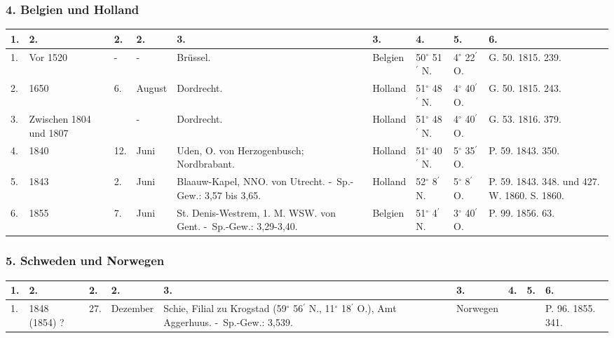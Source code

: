 \documentclass[a4paper, 8pt, oneside, polutonikogreek, german]{article}
\begin{document}
\subsubsection{4. Belgien und Holland}
\begin{table}[!ht]
    \centering
    \begin{tabular}{|l|p{17mm}|l|l|p{48mm}|l|l|l|p{13mm}|}
    \hline
        1. & 2. & 2. & 2. & 3. & 3. & 4. & 5. & 6. \\ \hline
        1. & Vor 1520 & - & - & Brüssel. & Belgien & 50$^\circ$ 51$^\prime$ N. & 4$^\circ$ 22$^\prime$ O. & G. 50. 1815. 239. \\ \hline
        2. & 1650 & 6. & August & Dordrecht. & Holland & 51$^\circ$ 48$^\prime$ N. & 4$^\circ$ 40$^\prime$ O. & G. 50. 1815. 243. \\ \hline
        3. & Zwischen 1804 und 1807 & ~ & - & Dordrecht. & Holland & 51$^\circ$ 48$^\prime$ N. & 4$^\circ$ 40$^\prime$ O. & G. 53. 1816. 379. \\ \hline
        4. & 1840 & 12. & Juni & Uden, O. von Herzogenbusch; Nordbrabant. & Holland & 51$^\circ$ 40$^\prime$ N. & 5$^\circ$ 35$^\prime$ O. & P. 59. 1843. 350. \\ \hline
        5. & 1843 & 2. & Juni & Blaauw-Kapel, NNO. von Utrecht. - Sp.-Gew.: 3,57 bis 3,65. & Holland & 52$^\circ$ 8$^\prime$ N. & 5$^\circ$ 8$^\prime$ O. & P. 59. 1843. 348. und 427. W. 1860. S. 1860. \\ \hline
        6. & 1855 & 7. & Juni & St. Denis-Westrem, 1. M. WSW. von Gent. - Sp.-Gew.: 3,29-3,40. & Belgien & 51$^\circ$ 4$^\prime$ N. & 3$^\circ$ 40$^\prime$ O. & P. 99. 1856. 63. \\ \hline
    \end{tabular}
\end{table}
\clearpage
\subsubsection{5. Schweden und Norwegen}
\begin{table}[!ht]
    \centering
    \begin{tabular}{|l|p{17mm}|l|l|p{48mm}|l|l|l|p{13mm}|}
    \hline
        1. & 2. & 2. & 2. & 3. & 3. & 4. & 5. & 6. \\ \hline
        1. & 1848 (1854) ? & 27. & Dezember & Schie, Filial zu Krogstad (59$^\circ$ 56$^\prime$ N., 11$^\circ$ 18$^\prime$ O.), Amt Aggerhuus. - Sp.-Gew.: 3,539. & Norwegen & ~ & ~ & P. 96. 1855. 341. \\ \hline
    \end{tabular}
\end{table}
\clearpage
\end{document}
